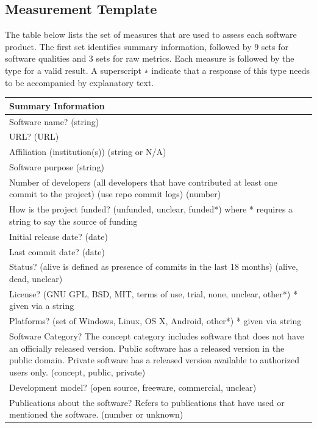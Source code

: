 \documentclass[12pt, notitlepage]{article}
\begin{document}
\begin{singlespace}
\newpage

\subsection{Measurement Template}\label{measurementtemplate2}
The table below lists the set of measures that are used to assess each software product. The first set identifies summary information, followed by 9 sets for software qualities and 3 sets for raw metrics. Each measure is followed by the type for a valid result. A superscript ∗ indicate that a response of this type needs to be accompanied by explanatory text. 

\label{measurementtemplate}
\def\arraystretch{1.22}
\begin{tabular}{p{16cm}}
		\hline
		\textbf{Summary Information}\\
		\hline
		Software name? (string)\\
		URL? (URL)\\
		Affiliation (institution(s)) (string or {N/A})\\
		Software purpose (string)\\
		Number of developers (all developers that have contributed at least one commit to the project) (use repo commit logs) (number)\\
		How is the project funded? (unfunded, unclear, funded*) where * requires a string to say the source of funding\\
		Initial release date? (date)\\
		Last commit date? (date)\\
		Status? (alive is defined as presence of commits in the last 18 months) ({alive, dead, unclear})\\
		License? ({GNU GPL, BSD, MIT, terms of use, trial, none, unclear, other*}) * given via a string \\
		Platforms? (set of {Windows, Linux, OS X, Android, other*}) * given via string\\
		Software Category? The concept category includes software that does not have an officially released version. Public software has a released version in the public domain. Private software has a released version available to authorized users only. ({concept, public, private})\\
		Development model? ({open source, freeware, commercial, unclear})\\
		Publications about the software? Refers to publications that have used or mentioned the software. (number or {unknown})\\

\end{tabular}
\end{singlespace}
\end{document}

